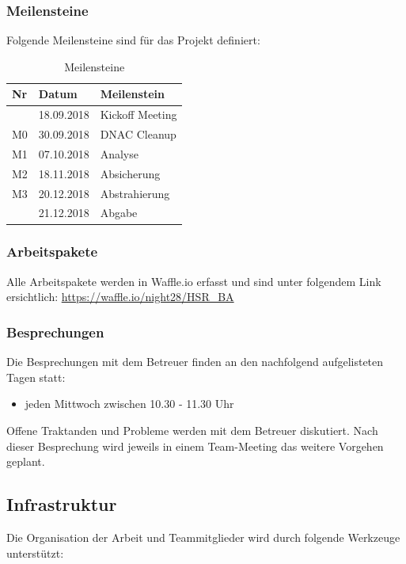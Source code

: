 \subsubsection{Meilensteine}
Folgende Meilensteine sind für das Projekt definiert:
\begin{table}[H]
	\centering
	\begin{tabularx}{\textwidth}{p{1cm}| p{2.5cm}| X}
		\rowcolor{gray!50}
		\textbf{Nr} & \textbf{Datum} & \textbf{Meilenstein} \\
		\hline	
		 & 18.09.2018 & Kickoff Meeting \\
		M0 & 30.09.2018 & DNAC Cleanup \\
		M1 & 07.10.2018 & Analyse \\
		M2 & 18.11.2018 & Absicherung \\
		M3 & 20.12.2018 & Abstrahierung \\
		 & 21.12.2018 & Abgabe \\
	\end{tabularx}
	\caption{Meilensteine}
	\label{tab:Meilensteine}
\end{table}



\subsubsection{Arbeitspakete}
Alle Arbeitspakete werden in Waffle.io erfasst und sind unter folgendem Link ersichtlich:
\href{Waffle.io}{https://waffle.io/night28/HSR\_BA}
\subsubsection{Besprechungen}
Die Besprechungen mit dem Betreuer finden an den nachfolgend aufgelisteten Tagen statt:
\begin{itemize}
	\item jeden Mittwoch zwischen 10.30 - 11.30 Uhr
\end{itemize}

Offene Traktanden und Probleme werden mit dem Betreuer diskutiert. Nach dieser Besprechung wird jeweils in einem Team-Meeting das weitere Vorgehen geplant.


\subsection{Infrastruktur}
Die Organisation der Arbeit und Teammitglieder wird durch folgende Werkzeuge unterstützt:

